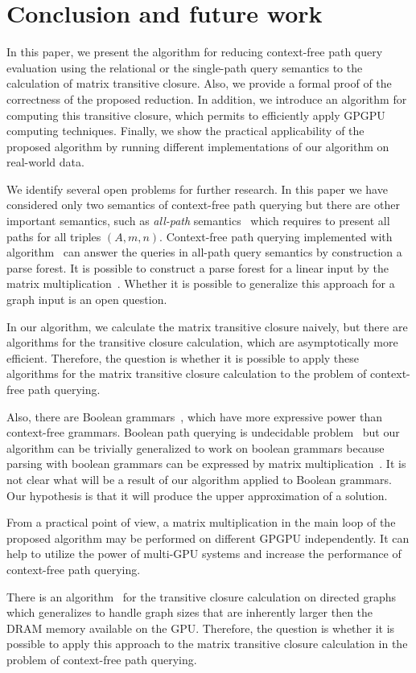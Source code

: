 \section{Conclusion and future work}
In this paper, we present the algorithm for reducing context-free path query evaluation using the relational or the single-path query semantics to the calculation of matrix transitive closure. Also, we provide a formal proof of the correctness of the proposed reduction. In addition, we introduce an algorithm for computing this transitive closure, which permits to efficiently apply GPGPU computing techniques. Finally, we show the practical applicability of the proposed algorithm by running different implementations of our algorithm on real-world data.

We identify several open problems for further research. In this paper we have considered only two semantics of context-free path querying but there are other important semantics, such as \textit{all-path} semantics~\cite{hellingsPathQuerying} which requires to present all paths for all triples $(A,m,n)$. Context-free path querying implemented with algorithm~\cite{GLL} can answer the queries in all-path query semantics by construction a parse forest. It is possible to construct a parse forest for a linear input by the matrix multiplication~\cite{okhotin_cyk}. Whether it is possible to generalize this approach for a graph input is an open question.

In our algorithm, we calculate the matrix transitive closure naively, but there are algorithms for the transitive closure calculation, which are asymptotically more efficient. Therefore, the question is whether it is possible to apply these algorithms for the matrix transitive closure calculation to the problem of context-free path querying.

Also, there are Boolean grammars~\cite{okhotinBoolean}, which have more expressive power than context-free grammars. Boolean path querying is undecidable problem~\cite{hellingsRelational} but our algorithm can be trivially generalized to work on boolean grammars because parsing with boolean grammars can be expressed by matrix multiplication~\cite{okhotin_cyk}. It is not clear what will be a result of our algorithm applied to Boolean grammars. Our hypothesis is that it will produce the upper approximation of a solution.

From a practical point of view, a matrix multiplication in the main loop of the proposed algorithm may be performed on different GPGPU independently. It can help to utilize the power of multi-GPU systems and increase the performance of context-free path querying.

There is an algorithm~\cite{apspGPU} for the transitive closure calculation on directed graphs which generalizes to handle graph sizes that are inherently larger then the DRAM memory available on the GPU. Therefore, the question is whether it is possible to apply this approach to the matrix transitive closure calculation in the problem of context-free path querying.